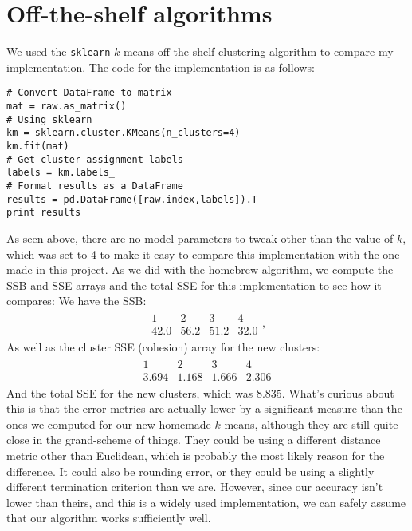 \documentclass[12pt,oneside,reqno]{amsart}
\theoremstyle{plain}
\theoremstyle{definition}
\theoremstyle{remark}
\newcommand{\bee}{\begin{equation}\begin{aligned}}
\newcommand{\eee}{\end{aligned}\end{equation}}
\newcommand{\inlinecode}{\texttt}
\begin{document}
\section{Off-the-shelf algorithms}

We used the \inlinecode{sklearn} $k$-means off-the-shelf clustering algorithm to compare my implementation. The code for the implementation is as follows:
\begin{lstlisting}
# Convert DataFrame to matrix
mat = raw.as_matrix()
# Using sklearn
km = sklearn.cluster.KMeans(n_clusters=4)
km.fit(mat)
# Get cluster assignment labels
labels = km.labels_
# Format results as a DataFrame
results = pd.DataFrame([raw.index,labels]).T
print results
\end{lstlisting}

As seen above, there are no model parameters to tweak other than the value of $k$, which was set to 4 to make it easy to compare this implementation with the one made in this project. As we did with the homebrew algorithm, we compute the SSB and SSE arrays and the total SSE for this implementation to see how it compares:
We have the SSB:
\bee
\begin{array}{llll}
1 & 2 & 3 & 4\\
\hline
42.0 & 56.2 & 51.2 &32.0
\end{array},
\eee
As well as the cluster SSE (cohesion) array for the new clusters:
\bee
\begin{array}{llll}
1 & 2 & 3 & 4\\
\hline
3.694 & 1.168 & 1.666 & 2.306
\end{array}
\eee
And the total SSE for the new clusters, which was 8.835. What's curious about this is that the error metrics are actually lower by a significant measure than the ones we computed for our new homemade $k$-means, although they are still quite close in the grand-scheme of things. They could be using a different distance metric other than Euclidean, which is probably the most likely reason for the difference. It could also be rounding error, or they could be using a slightly different termination criterion than we are. However, since our accuracy isn't lower than theirs, and this is a widely used implementation, we can safely assume that our algorithm works sufficiently well. 
\end{document}
